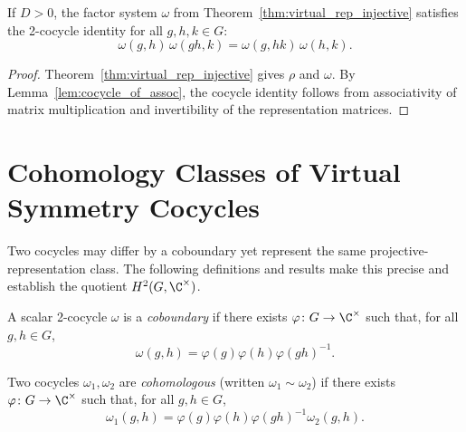 \begin{corollary}%
    \label{cor:virtual_rep_cocycle}
    \leanok
    If $D > 0$, the factor system $\omega$ from
    Theorem~\ref{thm:virtual_rep_injective} satisfies the
    2-cocycle identity for all $g,h,k \in G$:
    \[
        \omega(g, h)\, \omega(gh, k)
        = \omega(g, hk)\, \omega(h, k).
    \]
\end{corollary}

\begin{proof}
    \leanok
    Theorem~\ref{thm:virtual_rep_injective} gives $\rho$ and $\omega$.
    By Lemma~\ref{lem:cocycle_of_assoc}, the cocycle identity follows
    from associativity of matrix multiplication and invertibility of
    the representation matrices.
\end{proof}

\section{Cohomology Classes of Virtual Symmetry Cocycles}

Two cocycles may differ by a coboundary yet represent the same
projective-representation class. The following definitions and results
make this precise and establish the quotient $H^2(G,\C^{\times})$.

\begin{definition}[Coboundary]\label{def:is_coboundary}
    \leanok
    A scalar 2-cocycle $\omega$ is a \emph{coboundary} if there exists
    $\varphi \colon G \to \C^{\times}$ such that, for all $g,h \in G$,
    \[
        \omega(g,h)
        = \varphi(g) \varphi(h) \varphi(gh)^{-1}.
    \]
\end{definition}

\begin{definition}\label{def:cohomologous_to}
    \leanok
    Two cocycles $\omega_1,\omega_2$ are \emph{cohomologous}
    (written $\omega_1 \sim \omega_2$) if there exists
    $\varphi \colon G \to \C^{\times}$ such that, for all $g,h \in G$,
    \[
        \omega_1(g,h)
        = \varphi(g) \varphi(h) \varphi(gh)^{-1} \omega_2(g,h).
    \]
\end{definition}

